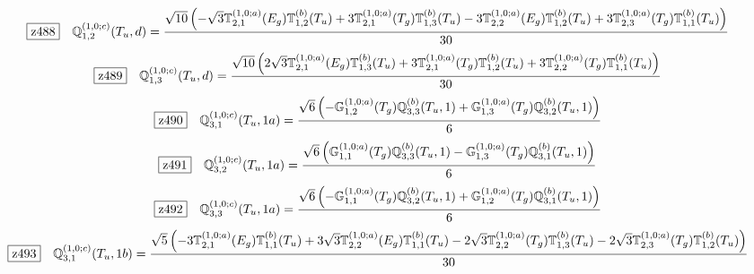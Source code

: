 \documentclass[fleqn,10pt,landscape]{jsarticle}
\begin{document}
\begin{dmath*}
\hspace*{3mm}\fbox{z488}\quad \mathbb{Q}_{1,2}^{(1,0;c)}(T_{u},d)=\frac{\sqrt{10} \left(- \sqrt{3} \mathbb{T}_{2,1}^{(1,0;a)}(E_{g}) \mathbb{T}_{1,2}^{(b)}(T_{u}) + 3 \mathbb{T}_{2,1}^{(1,0;a)}(T_{g}) \mathbb{T}_{1,3}^{(b)}(T_{u}) - 3 \mathbb{T}_{2,2}^{(1,0;a)}(E_{g}) \mathbb{T}_{1,2}^{(b)}(T_{u}) + 3 \mathbb{T}_{2,3}^{(1,0;a)}(T_{g}) \mathbb{T}_{1,1}^{(b)}(T_{u})\right)}{30}
\end{dmath*}
\begin{dmath*}
\hspace*{3mm}\fbox{z489}\quad \mathbb{Q}_{1,3}^{(1,0;c)}(T_{u},d)=\frac{\sqrt{10} \left(2 \sqrt{3} \mathbb{T}_{2,1}^{(1,0;a)}(E_{g}) \mathbb{T}_{1,3}^{(b)}(T_{u}) + 3 \mathbb{T}_{2,1}^{(1,0;a)}(T_{g}) \mathbb{T}_{1,2}^{(b)}(T_{u}) + 3 \mathbb{T}_{2,2}^{(1,0;a)}(T_{g}) \mathbb{T}_{1,1}^{(b)}(T_{u})\right)}{30}
\end{dmath*}
\begin{dmath*}
\hspace*{3mm}\fbox{z490}\quad \mathbb{Q}_{3,1}^{(1,0;c)}(T_{u},1a)=\frac{\sqrt{6} \left(- \mathbb{G}_{1,2}^{(1,0;a)}(T_{g}) \mathbb{Q}_{3,3}^{(b)}(T_{u},1) + \mathbb{G}_{1,3}^{(1,0;a)}(T_{g}) \mathbb{Q}_{3,2}^{(b)}(T_{u},1)\right)}{6}
\end{dmath*}
\begin{dmath*}
\hspace*{3mm}\fbox{z491}\quad \mathbb{Q}_{3,2}^{(1,0;c)}(T_{u},1a)=\frac{\sqrt{6} \left(\mathbb{G}_{1,1}^{(1,0;a)}(T_{g}) \mathbb{Q}_{3,3}^{(b)}(T_{u},1) - \mathbb{G}_{1,3}^{(1,0;a)}(T_{g}) \mathbb{Q}_{3,1}^{(b)}(T_{u},1)\right)}{6}
\end{dmath*}
\begin{dmath*}
\hspace*{3mm}\fbox{z492}\quad \mathbb{Q}_{3,3}^{(1,0;c)}(T_{u},1a)=\frac{\sqrt{6} \left(- \mathbb{G}_{1,1}^{(1,0;a)}(T_{g}) \mathbb{Q}_{3,2}^{(b)}(T_{u},1) + \mathbb{G}_{1,2}^{(1,0;a)}(T_{g}) \mathbb{Q}_{3,1}^{(b)}(T_{u},1)\right)}{6}
\end{dmath*}
\begin{dmath*}
\hspace*{3mm}\fbox{z493}\quad \mathbb{Q}_{3,1}^{(1,0;c)}(T_{u},1b)=\frac{\sqrt{5} \left(- 3 \mathbb{T}_{2,1}^{(1,0;a)}(E_{g}) \mathbb{T}_{1,1}^{(b)}(T_{u}) + 3 \sqrt{3} \mathbb{T}_{2,2}^{(1,0;a)}(E_{g}) \mathbb{T}_{1,1}^{(b)}(T_{u}) - 2 \sqrt{3} \mathbb{T}_{2,2}^{(1,0;a)}(T_{g}) \mathbb{T}_{1,3}^{(b)}(T_{u}) - 2 \sqrt{3} \mathbb{T}_{2,3}^{(1,0;a)}(T_{g}) \mathbb{T}_{1,2}^{(b)}(T_{u})\right)}{30}
\end{dmath*}
\end{document}
